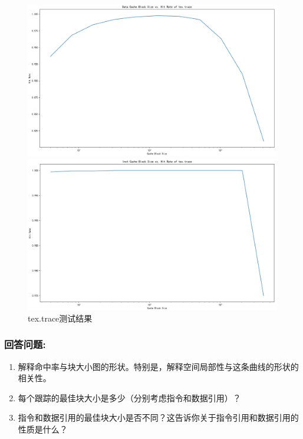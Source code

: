 \documentclass[12pt,hyperref,a4paper,UTF8]{ctexart}
\begin{document}
\begin{figure}[H]
    \centering
    \begin{minipage}[b]{0.45\textwidth}
        \centering
        \includegraphics[width=\textwidth]{./figures/fig/image25.png}
    \end{minipage}
    \hfill
    \begin{minipage}[b]{0.45\textwidth}
        \centering
        \includegraphics[width=\textwidth]{./figures/fig/image26.png}
    \end{minipage}
    \caption{tex.trace测试结果}
\end{figure}

\subsubsection*{回答问题:}
\begin{enumerate}
    \item 解释命中率与块大小图的形状。特别是，解释空间局部性与这条曲线的形状的相关性。
    \item 每个跟踪的最佳块大小是多少（分别考虑指令和数据引用）？
    \item 指令和数据引用的最佳块大小是否不同？这告诉你关于指令引用和数据引用的性质是什么？
\end{enumerate}
\end{document}
